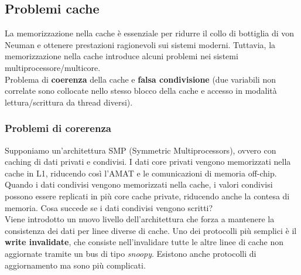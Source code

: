 \subsection{Problemi cache}
La memorizzazione nella cache è essenziale per ridurre il collo di bottiglia di von Neuman e ottenere prestazioni ragionevoli sui sistemi moderni. Tuttavia, la memorizzazione nella cache introduce alcuni problemi nei sistemi multiprocessore/multicore.\\ 
Problema di \textbf{coerenza} della cache e \textbf{falsa condivisione} (due variabili non correlate sono collocate nello stesso blocco della cache e accesso in modalità lettura/scrittura da thread diversi).

\subsubsection{Problemi di corerenza}
Supponiamo un'architettura SMP (Symmetric Multiprocessors), ovvero con caching di dati privati e condivisi. I dati core privati vengono memorizzati nella cache in L1, riducendo così l'AMAT e le comunicazioni di memoria off-chip. 
Quando i dati condivisi vengono memorizzati nella cache, i valori condivisi possono essere replicati in più core cache private, riducendo anche la contesa di memoria. Cosa succede se i dati condivisi vengono scritti? \\
Viene introdotto un nuovo livello dell'architettura che forza a mantenere la consistenza dei dati per linee diverse di cache. Uno dei protocolli più semplici è il \textbf{write invalidate}, che consiste nell'invalidare tutte le altre linee di cache non aggiornate tramite un bus di tipo \emph{snoopy}. Esistono anche protocolli di aggiornamento ma sono più complicati.
